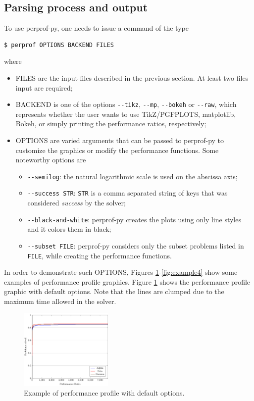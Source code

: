 \subsection*{Parsing process and output}

    To use perprof-py, one needs to issue a command of the type
\begin{verbatim}
$ perprof OPTIONS BACKEND FILES
\end{verbatim}
    where
    \begin{itemize}
      \item FILES are the input files described in the previous section. At
        least two files input are required;
      \item BACKEND is one of the options \verb+--tikz+, \verb+--mp+,
        \verb+--bokeh+ or
        \verb+--raw+, which represents whether the user wants to use
        TikZ/PGFPLOTS, matplotlib, Bokeh, or simply printing the performance
        ratios, respectively;
      \item OPTIONS are varied arguments that can be passed to perprof-py to
        customize the graphics or modify the performance functions. Some
        noteworthy options are
        \begin{itemize}
          \item \verb+--semilog+: the natural logarithmic scale is used on the
          abscissa axis;
          \item \verb+--success STR+: \verb+STR+ is a comma separated string
            of keys that was considered  \emph{success} by the solver;
          \item \verb+--black-and-white+: perprof-py creates the plots using
            only line styles and it colors them in black;
          \item \verb+--subset FILE+: perprof-py considers only the subset problems listed in \verb+FILE+, while creating the performance functions.
        \end{itemize}
    \end{itemize}
    In order to demonstrate such OPTIONS, Figures
    \ref{fig:example1}-\ref{fig:example4} show some examples of  performance
    profile graphics.
    Figure \ref{fig:example1} shows the performance profile graphic with default
    options. Note that the lines are clumped due to the maximum time allowed
    in the solver.
    \begin{figure}[!ht]
      \centering
      \includegraphics[width=0.4\textwidth]{plots/abc.pdf}
      \caption{Example of performance profile with default options.}
      \label{fig:example1}
    \end{figure}

